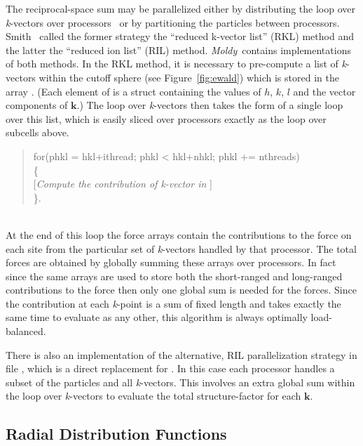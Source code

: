 \documentclass[a4paper,twoside]{report}
\providecommand{\bm}[1]{\mathbf{#1}}
\newcommand{\moldy}{\emph{Moldy}}
\begin{document}
The reciprocal-space sum may be parallelized either by distributing
the loop over \emph{k}-vectors over
processors~\cite{clementi:85,smith:92} or by partitioning the
particles between processors. Smith~\cite{smith:92} called the former
strategy the ``reduced k-vector list'' (RKL) method and the latter the
``reduced ion list'' (RIL) method.  \moldy\ contains implementations
of both methods.  In the RKL method, it is necessary to pre-compute a
list of \emph{k}-vectors within the cutoff sphere (see
Figure~\ref{fig:ewald}) which is stored in the array .
(Each element of  is a struct containing the values of $h$,
$k$, $l$ and the vector components of $\bm{k}$.) The loop over
\emph{k}-vectors then takes the form of a single loop over this list,
which is easily sliced over processors exactly as the loop over
subcells above.\\
\parbox{\textwidth}{%
\begin{quote}
  \Litf
   for(phkl = hkl+ithread; phkl < hkl+nhkl; phkl += nthreads)\\
   \{\\
\hspace*{1cm}\textnormal{[\emph{Compute the contribution of
   \emph{k}-vector in} ]}\\
   \}.
\end{quote}}\\
At the end of this loop the force arrays contain the contributions to
the force on each site from the particular set of \emph{k}-vectors
handled by that processor.  The total forces are obtained by globally
summing these arrays over processors.  In fact since the same arrays are
used to store both the short-ranged and long-ranged contributions to
the force then only one global sum is needed for the forces.  Since
the contribution at each \emph{k}-point is a sum of fixed length and
takes exactly the same time to evaluate as any other, this algorithm
is always optimally load-balanced.

There is also an implementation of the alternative, RIL
parallelization strategy in file , which is a direct
replacement for .  In this case each processor handles a
subset of the particles and all \emph{k}-vectors.  This involves an
extra global sum within the loop over \emph{k}-vectors to evaluate
the total structure-factor for each $\bm{k}$.  

\subsection{Radial Distribution Functions}
\end{document}
